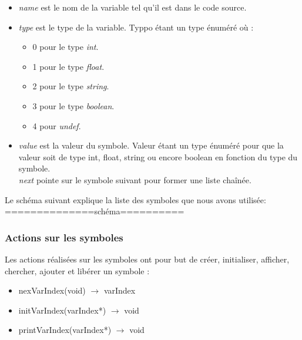 \documentclass{article}
\begin{document}
\begin{itemize}
\item \emph{name} est le nom de la variable tel qu'il est dans le code source. \\
\item \emph{type} est le type de la variable. Typpo étant un type énuméré où : \\
\begin{itemize}
\item 0 pour le type \emph{int}. \\
\item 1 pour le type \emph{float}.\\
\item 2 pour le type \emph{string}. \\
\item 3 pour le type \emph{boolean}. \\
\item 4 pour \emph{undef}. \\
\end{itemize}

\item \emph{value} est la valeur du symbole. Valeur étant un type énuméré pour que la valeur soit de type int, float, string ou encore boolean en fonction du type du symbole.\\
\emph{next} pointe sur le symbole suivant pour former une liste chaînée. \\
\end{itemize}

Le schéma suivant explique la liste des symboles que nous avons utilisée: \\

==============schéma==========

\subsubsection*{Actions sur les symboles}
Les actions réalisées sur les symboles ont pour but de créer, initialiser, afficher, chercher, ajouter et libérer un symbole : \\
\begin{itemize}
\item nexVarIndex(void) $\rightarrow$ varIndex \\
\item initVarIndex(varIndex*) $\rightarrow$ void \\
\item printVarIndex(varIndex*) $\rightarrow$ void \\
\end{itemize}
\end{document}
